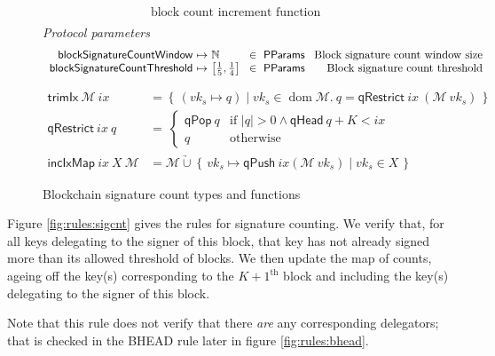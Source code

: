 \documentclass[11pt,a4paper]{article}
\DeclareMathOperator{\dom}{dom}
\newcommand\Set[2]{\left\{\,#1\mid#2\,\right\}}
\newcommand{\unionoverride}{\mathbin{\underrightarrow\cup}}
\newcommand{\var}[1]{\mathit{#1}}
\newcommand{\fun}[1]{\mathsf{#1}}
\newcommand{\type}[1]{\mathsf{#1}}
\newcommand{\pp}[1]{\mathsf{#1}}
\newcommand{\size}[1]{\left| #1 \right|}
\newcommand{\partialf}{\mapsto}
\newcommand{\ProtParams}{\type{PParams}} %
\newcommand{\signmapname}{\mathcal{M}}
\newcommand{\trimixname}{trimIx}
\newcommand{\incixmapname}{incIxMap}
\newcommand{\qrestrname}{qRestrict}
\newcommand{\qpopname}{qPop}
\newcommand{\qheadname}{qHead}
\newcommand{\qpushname}{qPush}
\newcommand{\signmap}[1]{\fun{\signmapname} ~ #1}
\newcommand{\qrestr}[2]{\fun{\qrestrname} ~ #1 ~ #2}
\newcommand{\trimix}[2]{\fun{\trimixname} ~ #1 ~ #2}
\newcommand{\incixmap}[3]{\fun{\incixmapname} ~ #1 ~ #2 ~ #3}
\newcommand{\qpop}[1]{\fun{\qpopname} ~ #1}
\newcommand{\qhead}[1]{\fun{\qheadname} ~ #1}
\newcommand{\qpush}[1]{\fun{\qpushname} ~ #1}
\begin{document}
\begin{figure}[ht]
\begin{align*}
                                                              & \text{block count increment function}\\
  \end{align*}
  \emph{Protocol parameters}
  \begin{equation*}
    \begin{array}{r@{~\partialf~}l!{~\in~\ProtParams~}r}
      \pp{blockSignatureCountWindow} & \mathbb{N} & \text{Block signature count window size} \\
      \pp{blockSignatureCountThreshold} & \left[\frac{1}{5}, \frac{1}{4}\right] & \text{Block signature count threshold} \\
    \end{array}
  \end{equation*}

  \begin{align}
    \label{eq:trimix}
    \trimix{\signmapname}{\var{ix}} & = \Set{(\var{vk_s} \partialf q)}{\var{vk_s} \in \dom \signmapname.~
                                      q = \qrestr{\var{ix}}{(\signmap{\var{vk_s}}})} \\
    \qrestr{\var{ix}}{q} & = \
                           \begin{cases}
                             \qpop{q} & \text{if } \size{q} > 0 \wedge \qhead{q} + K < \var{ix} \\
                             q & \text{otherwise}
                           \end{cases} \\
    \label{eq:incixmap}
    \incixmap{\var{ix}}{\var{X}}{\signmapname} & = \signmapname \unionoverride
                                                 \Set{\var{vk_s} \partialf \qpush{\var{ix}}(\signmap{\var{vk_s}})}{vk_s \in \var{X}}
  \end{align}
  \caption{Blockchain signature count types and functions}
  \label{fig:defs:sigcnt}
\end{figure}

Figure \ref{fig:rules:sigcnt} gives the rules for signature counting. We verify
that, for all keys delegating to the signer of this block, that key has not
already signed more than its allowed threshold of blocks. We then update the map
of counts, ageing off the key(s) corresponding to the $K+1^{\text{th}}$ block and
including the key(s) delegating to the signer of this block.

Note that this rule does not verify that there \textit{are} any corresponding
delegators; that is checked in the BHEAD rule later in figure \ref{fig:rules:bhead}.
\end{document}
